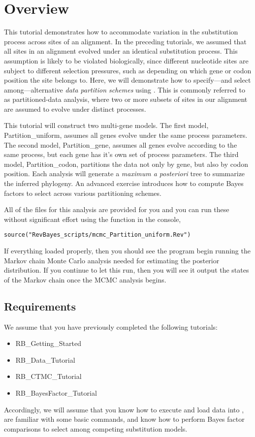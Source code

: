 \section{Overview}


This tutorial demonstrates how to accommodate variation in the substitution process across sites of an alignment.
In the preceding tutorials, we assumed that all sites in an alignment evolved under an identical substitution process.
This assumption is likely to be violated biologically, since different nucleotide sites are subject to different selection pressures, such as depending on which gene or codon position the site belongs to.
Here, we will demonstrate how to specify---and select among---alternative \emph{data partition schemes} using \RevBayes.
This is commonly referred to as partitioned-data analysis, where two or more subsets of sites in our alignment are assumed to evolve under distinct processes.

This tutorial will construct two multi-gene models.
The first model, Partition\_uniform, assumes all genes evolve under the same process parameters.
The second model, Partition\_gene, assumes all genes evolve according to the same process, but each gene has it's own set of process parameters.
The third model, Partition\_codon, partitions the data not only by gene, but also by codon position.
Each analysis will generate a {\it maximum a posteriori} tree to summarize the inferred phylogeny.
An advanced exercise introduces how to compute Bayes factors to select across various partitioning schemes.

All of the files for this analysis are provided for you and you can run these without significant effort using the  function in the \RevBayes console, \EG
{\tt \begin{snugshade*}
\begin{lstlisting}
source("RevBayes_scripts/mcmc_Partition_uniform.Rev")
\end{lstlisting}
\end{snugshade*}}

If everything loaded properly, then you should see the program begin running the Markov chain Monte Carlo analysis needed for estimating the posterior distribution. If you continue to let this run, then you will see it output the states of the Markov chain once the MCMC analysis begins.

\subsection{Requirements}
We assume that you have previously completed the following tutorials:
\begin{itemize}
\item RB\_Getting\_Started
\item RB\_Data\_Tutorial
\item RB\_CTMC\_Tutorial
\item RB\_BayesFactor\_Tutorial
\end{itemize}
Accordingly, we will assume that you know how to execute and load data into \RevBayes, are familiar with some basic commands, and know how to perform Bayes factor comparisons to select among competing substitution models.



